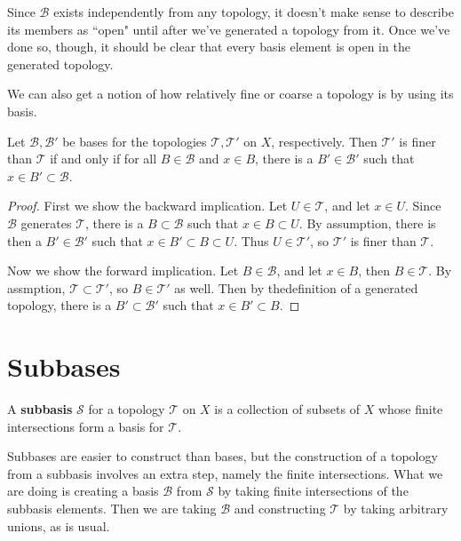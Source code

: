 \documentclass[10pt]{report}
\begin{document}
\begin{note}
Since $\mathcal{B}$ exists independently from any topology, it doesn't make sense to describe its members as ``open" until after we've generated a topology from it. Once we've done so, though, it should be clear that every basis element is open in the generated topology.
\end{note}

We can also get a notion of how relatively fine or coarse a topology is by using its basis.

\begin{prop}
	Let $\mathcal{B}, \mathcal{B}'$ be bases for the topologies $\mathcal{T},\mathcal{T}'$ on $X$, respectively. Then $\mathcal{T}'$ is finer than $\mathcal{T}$ if and only if for all $B \in \mathcal{B}$ and $x \in B$, there is a $B' \in \mathcal{B}'$ such that $x \in B' \subset \mathcal{B}$.
\end{prop}
\begin{proof}
	First we show the backward implication. Let $U \in \mathcal{T}$, and let $x \in U$. Since $\mathcal{B}$ generates $\mathcal{T}$, there is a $B \subset \mathcal{B}$ such that $x \in B \subset U$. By assumption, there is then a $B' \in \mathcal{B}'$ such that $x \in B' \subset B \subset U$. Thus $U \in \mathcal{T}'$, so $\mathcal{T}'$ is finer than $\mathcal{T}$.

	Now we show the forward implication. Let $B \in \mathcal{B}$, and let $x \in B$, then $B \in \mathcal{T}$. By assmption, $\mathcal{T} \subset \mathcal{T}'$, so $B \in \mathcal{T}'$ as well. Then by thedefinition of a generated topology, there is a $B' \subset \mathcal{B}'$ such that $x \in B' \subset B$.
\end{proof}


\section{Subbases}

\begin{defn}
	A \textbf{subbasis} $\mathcal{S}$ for a topology $\mathcal{T}$ on $X$ is a collection of subsets of $X$ whose finite intersections form a basis for $\mathcal{T}$.
\end{defn}

Subbases are easier to construct than bases, but the construction of a topology from a subbasis involves an extra step, namely the finite intersections. What we are doing is creating a basis $\mathcal{B}$ from $\mathcal{S}$ by taking finite intersections of the subbasis elements. Then we are taking $\mathcal{B}$ and constructing $\mathcal{T}$ by taking arbitrary unions, as is usual.
\end{document}
